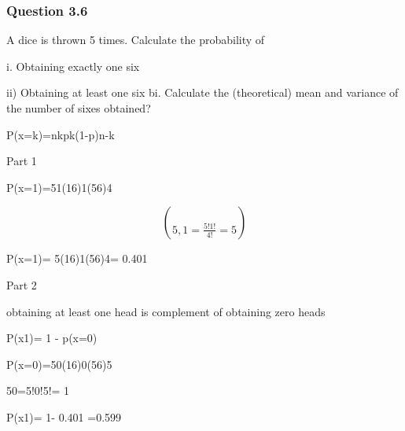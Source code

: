 







\subsubsection{Question 3.6}

A dice is thrown 5 times. Calculate the probability of

i.
Obtaining exactly one six


ii)    Obtaining at least one six
bi.
Calculate the (theoretical) mean and variance of the number of sixes obtained?



P(x=k)=nkpk(1-p)n-k






Part 1 


P(x=1)=51(16)1(56)4


\[ \choose{5,1}= \frac{5!1!}{4!}= 5\]


P(x=1)= 5(16)1(56)4= 0.401 




Part 2


obtaining at least one head is complement of obtaining zero heads


P(x1)= 1 - p(x=0)



P(x=0)=50(16)0(56)5


50=5!0!5!= 1


P(x1)= 1- 0.401 =0.599 

